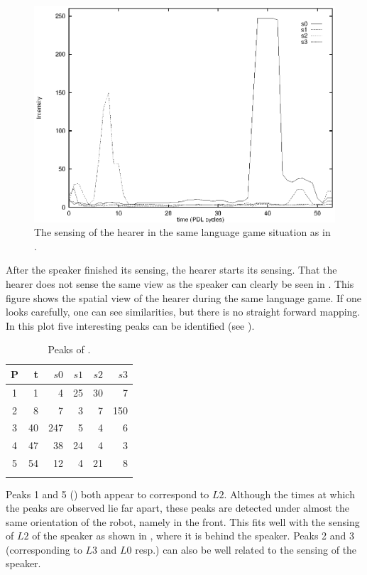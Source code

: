 \begin{figure}[t]
\centerline{\includegraphics[width=12cm]{lang_games/perception2.eps}}
\caption{The sensing of the hearer in the same language game situation as in .}
\label{f:perception2}
\end{figure}


After the speaker finished its sensing, the hearer starts its sensing. That the hearer does not sense the same view as the speaker can clearly be seen in . This figure shows the spatial view of the hearer during the same language game. If one looks carefully, one can see similarities, but there is no straight forward mapping. In this plot five interesting peaks can be identified (see ).

\begin{table}
\centering
\begin{tabular}{crrrrr}
\lsptoprule
P & t & $s0$ & $s1$ & $s2$ & $s3$\\
\midrule
1 & 1 & 4 & 25 & 30 & 7\\
2 & 8 & 7 & 3 & 7 & 150\\
3 & 40 & 247 & 5 & 4 & 6\\
4 & 47 & 38 & 24 & 4 & 3\\
5 & 54 & 12 & 4 & 21 & 8\\
\lspbottomrule
\end{tabular}
\caption{Peaks of .}
\label{t:perception2}
\end{table}

Peaks 1 and 5 () both appear to correspond to $L2$. Although the times at which the peaks are observed lie far apart, these peaks are detected under almost the same orientation of the robot, namely in the front. This fits well with the sensing of $L2$ of the speaker as shown in , where it is behind the speaker. Peaks 2 and 3 (corresponding to $L3$ and $L0$ resp.) can also be well related to the sensing of the speaker. 

